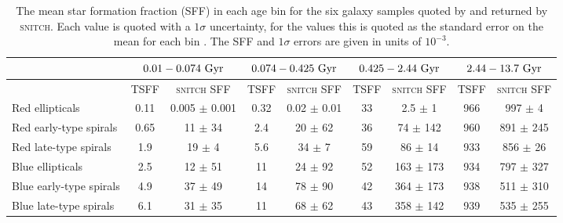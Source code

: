 \documentclass[useAMS,usenatbib]{mn2e}
\begin{document}
\begin{table*}
\centering
\caption{The mean star formation fraction (SFF) in each age bin for the six galaxy samples quoted by \protect\cite[][TSFF]{tojeiro13} and returned by \textsc{snitch}. Each value is quoted with a $1\sigma$ uncertainty, for the \protect\cite{tojeiro13} values this is quoted as the standard error on the mean for each bin . The SFF and $1\sigma$ errors are given in units of $10^{-3}$.}
\label{table:tojeirocompare}
\begin{tabular*}{0.9\textwidth}{l|cc|cc|cc|cc}
                        & \multicolumn{2}{c|}{$0.01 - 0.074~\rm{Gyr}$}     & \multicolumn{2}{c|}{$0.074 - 0.425~\rm{Gyr}$} & \multicolumn{2}{c|}{$0.425 - 2.44~\rm{Gyr}$} & \multicolumn{2}{c}{$2.44 - 13.7~\rm{Gyr}$} \\ \hline
                        & TSFF & \multicolumn{1}{c|}{\textsc{snitch} SFF} & TSFF          & \textsc{snitch} SFF          & TSFF          & \textsc{snitch} SFF         & TSFF         & \textsc{snitch} SFF        \\ \hline
Red ellipticals         & 0.11   &  0.005 $\pm$ 0.001  &  0.32  &    0.02 $\pm$ 0.01   &  33   &   2.5 $\pm$ 1   &  966  &   997 $\pm$ 4    \\
Red early-type spirals  & 0.65   &  11 $\pm$ 34  &  2.4   &  20 $\pm$ 62     &  36   &   74 $\pm$ 142   &  960  &   891 $\pm$ 245    \\
Red late-type spirals   &  1.9   &  19 $\pm$ 4   &  5.6   &   34 $\pm$ 7    &  59   &   86 $\pm$ 14   &  933  &   856 $\pm$ 26    \\ \hline
Blue ellipticals        &  2.5   &  12 $\pm$ 51   &  11    &   24 $\pm$ 92    &  52   &   163 $\pm$ 173   &  934  &     797 $\pm$ 327  \\
Blue early-type spirals &  4.9   &  37 $\pm$ 49  &  14    &   78 $\pm$ 90    &  42   &   364 $\pm$ 173   &  938  &  511 $\pm$ 310     \\
Blue late-type spirals  &  6.1   &  31 $\pm$ 35  &  11    &   68 $\pm$ 62    &  43   &    358 $\pm$ 142  &  939  & 535 $\pm$ 255                              
\end{tabular*}
\end{table*}



\end{document}
